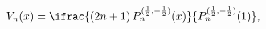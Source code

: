 \[\mathop{V_{n}\/}\nolimits\!\left(x\right)=\ifrac{(2n+1)\mathop{P^{(\frac{1}{2}%
,-\frac{1}{2})}_{n}\/}\nolimits\!\left(x\right)}{\mathop{P^{(\frac{1}{2},-%
\frac{1}{2})}_{n}\/}\nolimits\!\left(1\right)},\]